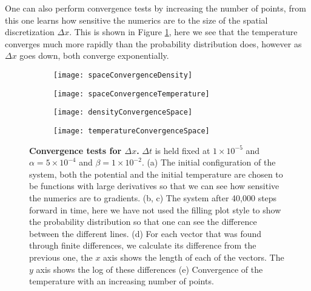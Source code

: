 One can also perform convergence tests by increasing the number of points, from this one learns how sensitive the numerics are to the size of the spatial discretization $\Delta x$. This is shown in Figure \ref{fig:spaceConvergence}, here we see that the temperature converges much more rapidly than the probability distribution does, however as $\Delta x$ goes down, both converge exponentially.

\begin{figure}

	\begin{subfigure}{0.49\textwidth}
		\texttt{[image: spaceConvergenceDensity]}
		\caption{}
	\end{subfigure}
	\begin{subfigure}{0.49\textwidth}
		\texttt{[image: spaceConvergenceTemperature]}
		\caption{}
	\end{subfigure}

	\begin{subfigure}{0.49\textwidth}
		\texttt{[image: densityConvergenceSpace]}
		\caption{}
	\end{subfigure}
	\begin{subfigure}{0.49\textwidth}
		\texttt{[image: temperatureConvergenceSpace]}
		\caption{}
	\end{subfigure}
\caption{\textbf{Convergence tests for $\Delta x$.} $\Delta t$ is held fixed at $1 \times 10^{-5}$ and $\alpha = 5 \times 10^{-4}$ and $\beta = 1 \times 10^{-2}$. (a) The initial configuration of the system, both the potential and the initial temperature are chosen to be functions with large derivatives so that we can see how sensitive the numerics are to gradients. (b, c) The system after 40,000 steps forward in time, here we have not used the filling plot style to show the probability distribution so that one can see the difference between the different lines. (d) For each vector that was found through finite differences, we calculate its difference from the previous one, the $x$ axis shows the length of each of the vectors. The $y$ axis shows the log of these differences (e) Convergence of the temperature with an increasing number of points. \label{fig:spaceConvergence}}
\end{figure}